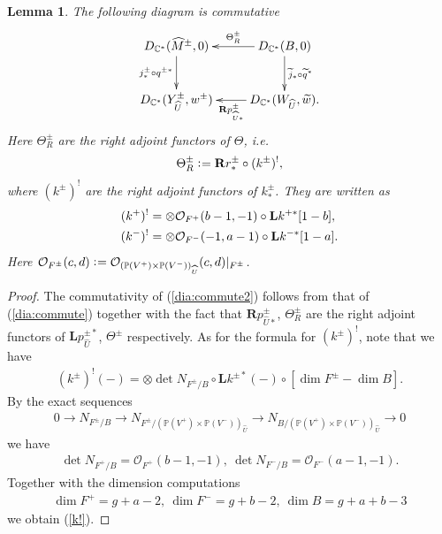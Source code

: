 \documentclass[11pt]{amsart}
\theoremstyle{plain}
\newtheorem{lem}[thm]{Lemma}
\newcommand{\oO}{\mathcal{O}}
\newcommand{\dR}{\mathbf{R}}
\newcommand{\dL}{\mathbf{L}}
\begin{document}
\begin{lem}\label{lem:commute2}
The following diagram is commutative
\begin{align}\label{dia:commute2}
\xymatrix{
D_{\mathbb{C}^{\ast}}(\widehat{M}^{\pm}, 0)  
\ar[d]_-{j^{\pm}_{\ast}\circ q^{\pm \ast}}&
D_{\mathbb{C}^{\ast}}(B, 0) \ar[l]_-{\Theta_R^{\pm}}
\ar[d]^-{\widetilde{j}_{\ast} \circ \widetilde{q}^{\ast}} \\
D_{\mathbb{C}^{\ast}}(Y_{\widehat{U}}^{\pm}, w^{\pm})  & 
D_{\mathbb{C}^{\ast}}(W_{\widehat{U}}, \widetilde{w}) 
\ar[l]^-{\dR p_{\widehat{U}\ast}^{\pm}}.
}
\end{align}
Here $\Theta_R^{\pm}$ are 
the right adjoint functors of $\Theta$, i.e. 
\begin{align*}
\Theta_R^{\pm} \cneq \dR r_{\ast}^{\pm} \circ (k^{\pm})^{!},
\end{align*}
where $(k^{\pm})^{!}$ are the right adjoint functors of 
$k^{\pm}_{\ast}$. They are written as
\begin{align}\label{k!}
(k^{+})^{!} &=\otimes \oO_{F^+}(b-1, -1) \circ \dL k^{+ \ast}[1-b], \\
\notag
(k^{-})^{!} &=\otimes \oO_{F^-}(-1, a-1) \circ \dL k^{- \ast}[1-a].
\end{align}
Here $\oO_{F^{\pm}}(c, d) \cneq 
\oO_{(\mathbb{P}(V^+) \times \mathbb{P}(V^-))_{\widehat{U}}}(c, d)|_{F^{\pm}}$. 
\end{lem}
\begin{proof}
The commutativity of (\ref{dia:commute2}) follows 
from that of (\ref{dia:commute}) together with the 
fact that $\dR p_{\widehat{U}\ast}^{\pm}$, 
$\Theta^{\pm}_R$ are the right adjoint functors of 
$\dL p_{\widehat{U}}^{\pm \ast}$, $\Theta^{\pm}$ respectively. 
As for the formula for $(k^{\pm})^{!}$,
note that we have 
\begin{align*}
(k^{\pm})^{!}(-)
=\otimes \det N_{F^{\pm}/B} \circ \dL k^{\pm \ast}(-)
\circ 
[\dim F^{\pm}-\dim B].
\end{align*}
By the exact sequences
\begin{align*}
0 \to N_{F^{\pm}/B} \to 
N_{F^{\pm}/(\mathbb{P}(V^+) \times \mathbb{P}(V^-))_{\widehat{U}}}
\to N_{B/(\mathbb{P}(V^+) \times \mathbb{P}(V^-))_{\widehat{U}}} \to 0
\end{align*}
we have 
\begin{align*}
\det N_{F^{+}/B}=\oO_{F^+}(b-1, -1), \ 
\det N_{F^-/B}=\oO_{F^-}(a-1, -1).
\end{align*}
Together with the dimension computations
\begin{align}\label{dim:form}
\dim F^+=g+a-2, \ 
\dim F^-=g+b-2, \ 
\dim B=g+a+b-3
\end{align}
we obtain (\ref{k!}). 
\end{proof}
\end{document}

